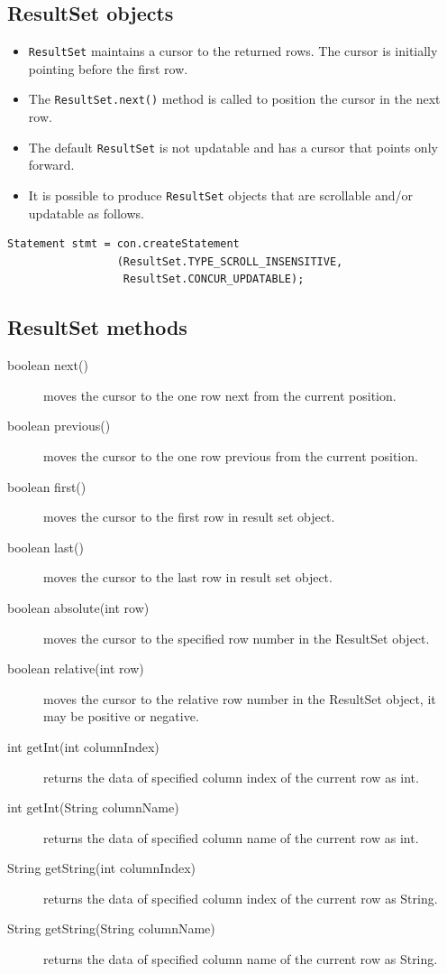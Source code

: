 \documentclass[11pt,a4paper]{article}
\begin{document}
\subsection*{ResultSet objects}
\begin{itemize}
    \item \texttt{ResultSet} maintains a cursor to the returned rows. The cursor is initially pointing before the first row.
    \item The \texttt{ResultSet.next()} method is called to position the cursor in the next row.
    \item The default \texttt{ResultSet} is not updatable and has a cursor that points only forward.
    \item It is possible to produce \texttt{ResultSet} objects that are scrollable and/or updatable as follows.
\end{itemize}
\begin{lstlisting}[numbers=none]
Statement stmt = con.createStatement
                 (ResultSet.TYPE_SCROLL_INSENSITIVE,  
                  ResultSet.CONCUR_UPDATABLE);
\end{lstlisting}

\subsection*{ResultSet methods}
\begin{description}
\item[boolean next()] moves the cursor to the one row next from the current position.
\item[boolean previous()] moves the cursor to the one row previous from the current position.
\item[boolean first()] moves the cursor to the first row in result set object.
\item[boolean last()] moves the cursor to the last row in result set object.
\item[boolean absolute(int row)] moves the cursor to the specified row number in the ResultSet object.
\item[boolean relative(int row)] moves the cursor to the relative row number in the ResultSet object, it may be positive or negative.
\item[int getInt(int columnIndex)] returns the data of specified column index of the current row as int.
\item[int getInt(String columnName)] returns the data of specified column name of the current row as int.
\item[String getString(int columnIndex)] returns the data of specified column index of the current row as String.
\item[String getString(String columnName)] returns the data of specified column name of the current row as String.
\end{description}
\end{document}
